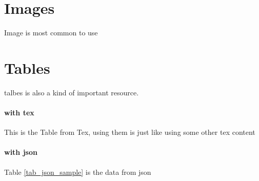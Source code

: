 \documentclass{article}
\begin{document}
\section{Images}
Image is most common to use

\section{Tables}
talbes is also a kind of important resource.

\paragraph{with tex}
This is the Table from Tex, using them is just like using some other tex content
\begin{table}[h!]


\end{table}

\paragraph{with json}
Table \ref{tab_json_sample} is the data from json
\begin{table}[h!]

\end{table}
\end{document}
